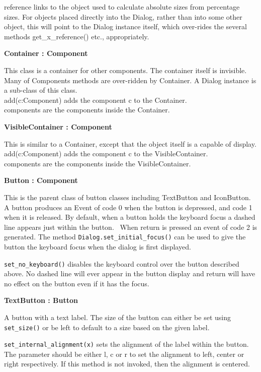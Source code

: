 reference links to the object used to calculate absolute sizes from
percentage sizes. For objects placed directly into the Dialog, rather
than into some other object, this will point to the Dialog instance
itself, which over-rides the several methods get\_x\_reference() etc.,
appropriately.

{\ttfamily\bfseries
{}Container : Component}

This class is a container for other components. The container itself is
invisible. Many of Component{\textquotesingle}s methods are over-ridden
by Container. A Dialog instance is a sub-class of this
class.\\
add(c:Component) adds the component c to the Container.\\
components are the components inside the Container.

{\ttfamily\bfseries
{}VisibleContainer : Component}

This is similar to a Container, except that the object itself is a
capable of display.\\
add(c:Component) adds the component c to the VisibleContainer.\\
components are the components inside the VisibleContainer.

{\ttfamily\bfseries
{}Button : Component}

This is the parent class of button classes including TextButton and
IconButton. A button produces an Event of code 0 when the button is
depressed, and code 1 when it is released. By default, when a button
holds the keyboard focus a dashed line appears just
within the button. \ When return is pressed an event of code 2 is
generated. The method \texttt{Dialog.set\_initial\_focus()} can be used to give
the button the keyboard focus when the dialog is first displayed.

\texttt{set\_no\_keyboard()} disables the keyboard control over the button
described above. No dashed line will ever appear in the button
display and return will have no effect on the button even if it has the
focus.

{\ttfamily\bfseries
{}TextButton : Button}

A button with a text label. The size of the button can either be set
using \texttt{set\_size()} or be left to default to a size based on the given
label.

\texttt{set\_internal\_alignment(x)} sets the alignment of the label within the
button. The parameter should be either {\textquotedbl}l{\textquotedbl},
{\textquotedbl}c{\textquotedbl} or {\textquotedbl}r{\textquotedbl} to
set the alignment to left, center or right respectively. If this method
is not invoked, then the alignment is centered.

